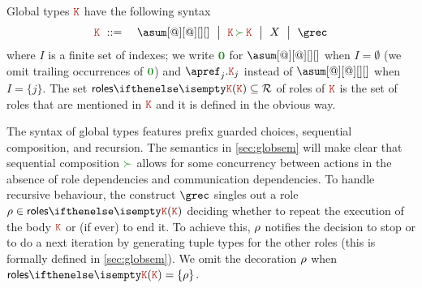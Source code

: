 Global types $\aK$ have the following syntax
\begin{eqnarray*}
  \aK & \bnfdef & \asum[@][@][][]
                  \bnfmid
                  \aK \seqop \aK \bnfmid
                  X \bnfmid
                  \grec
\end{eqnarray*}
where $I$ is a finite set of indexes; we write $\nil$ for
$\asum[@][@][][]$ when $I = \emptyset$ (we omit trailing occurrences
of $\nil$) and $\apref_j.\aK_j$ instead of $\asum[@][@][][]$ when
$I = \{j\}$.
%
The set $\roles \aK \subseteq \roleset$ of roles of $\aK$ is the set of roles that are mentioned in $\aK$ and it is defined in the obvious way.

The syntax of global types features prefix guarded choices, sequential
composition, and recursion.
%
The semantics in \cref{sec:globsem} will make clear that sequential composition $\seqop$ allows for some concurrency between actions in the absence of role dependencies and communication dependencies.
%
To handle recursive behaviour, 
the construct $\grec$ singles out a role $\arole \in \roles \aK$
%
deciding 
%
whether 
to repeat the execution of  the body $\aK$  or (if ever) to end it.
%
To achieve this,  $\rho$ notifies the decision to stop or to do a next iteration by generating tuple types for the
other roles (this is formally defined in \cref{sec:globsem}).
%
We omit the decoration $\rho$ when $\roles \aK = \{\arole\}$.


